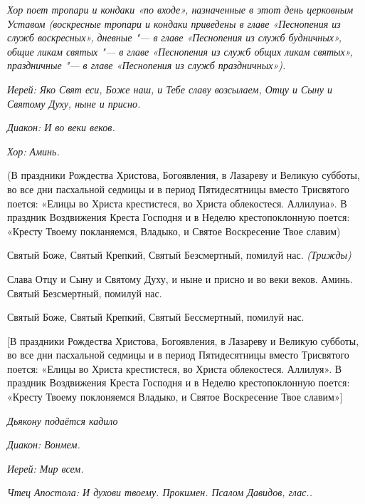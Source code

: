 

\itshape Хор поет тропари и кондаки «по входе», назначенные в этот день церковным Уставом (воскресные тропари и кондаки приведены в главе «Песнопения из служб воскресных», дневные "--- в главе «Песнопения из служб будничных», общие ликам святых "--- в главе «Песнопения из служб общих ликам святых», праздничные "--- в главе «Песнопения из служб праздничных»).\normalfont{}


\itshape Иерей:\normalfont{} Яко Свят еси, Боже наш, и Тебе славу возсылаем, Отцу и Сыну и Святому Духу, ныне и присно.


\itshape Диакон:\normalfont{} И во веки веков.


\itshape Хор:\normalfont{} Аминь.






(В праздники Рождества Христова, Богоявления, в Лазареву и Великую субботы, во все дни пасхальной седмицы и в период Пятидесятницы вместо Трисвятого поется: «Елицы во Христа крестистеся, во Христа облекостеся. Аллилуиа». В праздник Воздвижения Креста Господня и в Неделю крестопоклонную поется: «Кресту Твоему покланяемся, Владыко, и Святое Воскресение Твое славим)


Святый Боже, Святый Крепкий, Святый Безсмертный, помилуй нас. \itshape (Трижды)\normalfont{}


Слава Отцу и Сыну и Святому Духу, и ныне и присно и во веки веков. Аминь. Святый Безсмертный, помилуй нас.


Святый Боже, Святый Крепкий, Святый Бессмертный, помилуй нас.


[В праздники Рождества Христова, Богоявления, в Лазареву и Великую субботы, во все дни пасхальной седмицы и в период Пятидесятницы вместо Трисвятого поется: «Елицы во Христа крестистеся, во Христа облекостеся. Аллилуя». В праздник Воздвижения Креста Господня и в Неделю крестопоклонную поется: «Кресту Твоему поклоняемся Владыко, и Святое Воскресение Твое славим»]






\itshape Дьякону подаётся кадило\normalfont{}


\itshape Диакон:\normalfont{} Вонмем.


\itshape Иерей:\normalfont{} Мир всем.


\itshape Чтец Апостола:\normalfont{} И духови твоему. Прокимен. Псалом Давидов, глас..




